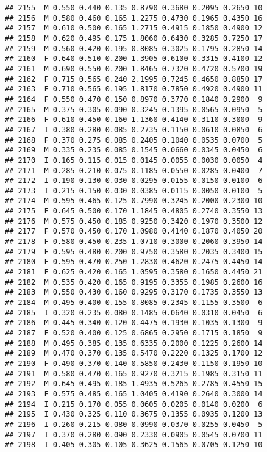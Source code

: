 \documentclass[
]{article}
\begin{document}
\begin{verbatim}
## 2155  M 0.550 0.440 0.135 0.8790 0.3680 0.2095 0.2650 10
## 2156  M 0.580 0.460 0.165 1.2275 0.4730 0.1965 0.4350 16
## 2157  M 0.610 0.500 0.165 1.2715 0.4915 0.1850 0.4900 12
## 2158  M 0.620 0.495 0.175 1.8060 0.6430 0.3285 0.7250 17
## 2159  M 0.560 0.420 0.195 0.8085 0.3025 0.1795 0.2850 14
## 2160  F 0.640 0.510 0.200 1.3905 0.6100 0.3315 0.4100 12
## 2161  M 0.690 0.550 0.200 1.8465 0.7320 0.4720 0.5700 19
## 2162  F 0.715 0.565 0.240 2.1995 0.7245 0.4650 0.8850 17
## 2163  F 0.710 0.565 0.195 1.8170 0.7850 0.4920 0.4900 11
## 2164  F 0.550 0.470 0.150 0.8970 0.3770 0.1840 0.2900  9
## 2165  M 0.375 0.305 0.090 0.3245 0.1395 0.0565 0.0950  5
## 2166  F 0.610 0.450 0.160 1.1360 0.4140 0.3110 0.3000  9
## 2167  I 0.380 0.280 0.085 0.2735 0.1150 0.0610 0.0850  6
## 2168  F 0.370 0.275 0.085 0.2405 0.1040 0.0535 0.0700  5
## 2169  M 0.335 0.235 0.085 0.1545 0.0660 0.0345 0.0450  6
## 2170  I 0.165 0.115 0.015 0.0145 0.0055 0.0030 0.0050  4
## 2171  M 0.285 0.210 0.075 0.1185 0.0550 0.0285 0.0400  7
## 2172  I 0.190 0.130 0.030 0.0295 0.0155 0.0150 0.0100  6
## 2173  I 0.215 0.150 0.030 0.0385 0.0115 0.0050 0.0100  5
## 2174  M 0.595 0.465 0.125 0.7990 0.3245 0.2000 0.2300 10
## 2175  F 0.645 0.500 0.170 1.1845 0.4805 0.2740 0.3550 13
## 2176  M 0.575 0.450 0.185 0.9250 0.3420 0.1970 0.3500 12
## 2177  F 0.570 0.450 0.170 1.0980 0.4140 0.1870 0.4050 20
## 2178  F 0.580 0.450 0.235 1.0710 0.3000 0.2060 0.3950 14
## 2179  F 0.595 0.480 0.200 0.9750 0.3580 0.2035 0.3400 15
## 2180  F 0.595 0.470 0.250 1.2830 0.4620 0.2475 0.4450 14
## 2181  F 0.625 0.420 0.165 1.0595 0.3580 0.1650 0.4450 21
## 2182  M 0.535 0.420 0.165 0.9195 0.3355 0.1985 0.2600 16
## 2183  M 0.550 0.430 0.160 0.9295 0.3170 0.1735 0.3550 13
## 2184  M 0.495 0.400 0.155 0.8085 0.2345 0.1155 0.3500  6
## 2185  I 0.320 0.235 0.080 0.1485 0.0640 0.0310 0.0450  6
## 2186  M 0.445 0.340 0.120 0.4475 0.1930 0.1035 0.1300  9
## 2187  F 0.520 0.400 0.125 0.6865 0.2950 0.1715 0.1850  9
## 2188  M 0.495 0.385 0.135 0.6335 0.2000 0.1225 0.2600 14
## 2189  M 0.470 0.370 0.135 0.5470 0.2220 0.1325 0.1700 12
## 2190  F 0.490 0.370 0.140 0.5850 0.2430 0.1150 0.1950 10
## 2191  M 0.580 0.470 0.165 0.9270 0.3215 0.1985 0.3150 11
## 2192  M 0.645 0.495 0.185 1.4935 0.5265 0.2785 0.4550 15
## 2193  F 0.575 0.485 0.165 1.0405 0.4190 0.2640 0.3000 14
## 2194  I 0.215 0.170 0.055 0.0605 0.0205 0.0140 0.0200  6
## 2195  I 0.430 0.325 0.110 0.3675 0.1355 0.0935 0.1200 13
## 2196  I 0.260 0.215 0.080 0.0990 0.0370 0.0255 0.0450  5
## 2197  I 0.370 0.280 0.090 0.2330 0.0905 0.0545 0.0700 11
## 2198  I 0.405 0.305 0.105 0.3625 0.1565 0.0705 0.1250 10

\end{verbatim}
\end{document}
